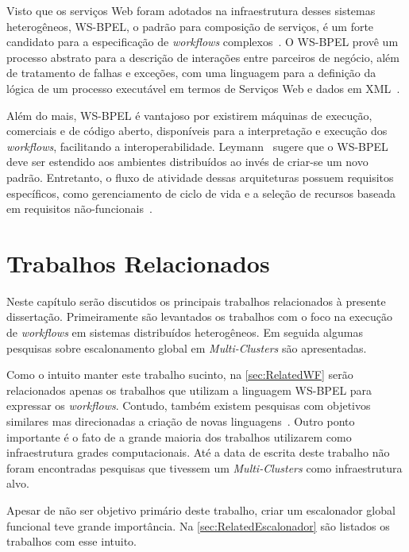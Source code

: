 \documentclass[12pt]{report} %
\begin{document}
	    Visto que os serviços Web foram adotados na infraestrutura desses sistemas heterogêneos, WS-BPEL, o padrão para composição de serviços, é um forte candidato para a especificação de \textit{workflows} complexos~\cite{Khalaf06}.
	    O WS-BPEL provê um processo abstrato para a descrição de interações entre parceiros de negócio, além de tratamento de falhas e exceções, com uma linguagem para a definição da lógica de um processo executável em termos de Serviços Web e dados em XML~\cite{FOX06}.
	    
	    Além do mais, WS-BPEL é vantajoso por existirem máquinas de execução, comerciais e de código aberto, disponíveis para a interpretação e execução dos \textit{workflows}, facilitando a interoperabilidade.
	    Leymann~\cite{Leymann06} sugere que o WS-BPEL deve ser estendido aos ambientes distribuídos ao invés de criar-se um novo padrão.
	    Entretanto, o fluxo de atividade dessas arquiteturas possuem requisitos específicos, como gerenciamento de ciclo de vida e a seleção de recursos baseada em requisitos não-funcionais~\cite{krishnan02gsfl}.

\chapter{Trabalhos Relacionados}
\label{chap:RelatedWork}
    Neste capítulo serão discutidos  os principais trabalhos relacionados à presente dissertação.
    Primeiramente são levantados os trabalhos com o foco na execução de \textit{workflows} em sistemas distribuídos heterogêneos.
    Em seguida algumas pesquisas sobre escalonamento global em \textit{Multi-Clusters} são apresentadas.

    Como o intuito manter este trabalho sucinto, na \autoref{sec:RelatedWF} serão relacionados apenas os trabalhos que utilizam a linguagem WS-BPEL para expressar os \textit{workflows}.
    Contudo, também existem pesquisas com objetivos similares mas direcionadas a criação de novas linguagens~\cite{krishnan02gsfl,Tsalgatidou06,Dieter06}.
    Outro ponto importante é o fato de a grande maioria dos trabalhos utilizarem como infraestrutura grades computacionais.
    Até a data de escrita deste trabalho não foram encontradas pesquisas que tivessem um \textit{Multi-Clusters} como infraestrutura alvo.

    Apesar de não ser objetivo primário deste trabalho, criar um escalonador global funcional teve grande importância.
    Na \autoref{sec:RelatedEscalonador} são listados os trabalhos com esse intuito.
\end{document}
